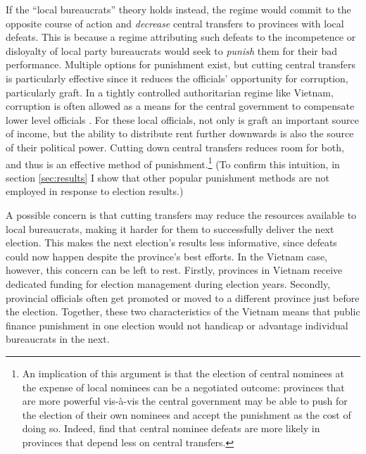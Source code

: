 \documentclass[12pt]{article}\usepackage[]{graphicx}\usepackage[]{color}
\newcommand{\1}{\mathbbm{1}}
\begin{document}
If the ``local bureaucrats'' theory holds instead, the regime would commit to the opposite course of action and \textit{decrease} central transfers to provinces with local defeats. This is because a regime attributing such defeats to the incompetence or disloyalty of local party bureaucrats would seek to \textit{punish} them for their bad performance. Multiple options for punishment exist, but cutting central transfers is particularly effective since it reduces the officials' opportunity for corruption, particularly graft. In a tightly controlled authoritarian regime like Vietnam, corruption is often allowed as a means for the central government to compensate lower level officials \citep{Darden2008}. For these local officials, not only is graft an important source of income, but the ability to distribute rent further downwards is also the source of their political power. Cutting down central transfers reduces room for both, and thus is an effective method of punishment.\footnote{An implication of this argument is that the election of central nominees at the expense of local nominees can be a negotiated outcome: provinces that are more powerful vis-\`{a}-vis the central government may be able to push for the election of their own nominees and accept the punishment as the cost of doing so. Indeed, \cite{MaleskySchuler2011} find that central nominee defeats are more likely in provinces that depend less on central transfers.} (To confirm this intuition, in section \ref{sec:results} I show that other popular punishment methods are not employed in response to election results.)

A possible concern is that cutting transfers may reduce the resources available to local bureaucrats, making it harder for them to successfully deliver the next election. This makes the next election's results less informative, since defeats could now happen despite the province's best efforts. In the Vietnam case, however, this concern can be left to rest. Firstly, provinces in Vietnam receive dedicated funding for election management during election years. Secondly, provincial officials often get promoted or moved to a different province just before the election. Together, these two characteristics of the Vietnam means that public finance punishment in one election would not handicap or advantage individual bureaucrats in the next.
\end{document}
